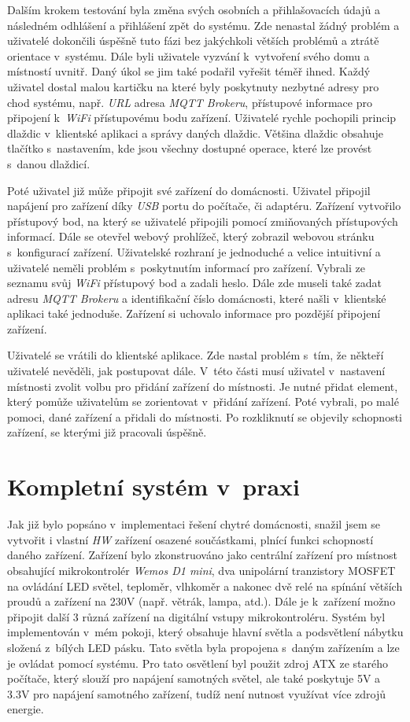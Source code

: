Dalším krokem testování byla změna svých osobních a přihlašovacích údajů a následném odhlášení a přihlášení zpět do systému.
Zde nenastal žádný problém a uživatelé dokončili úspěšně tuto fázi bez jakýchkoli větších problémů a ztrátě orientace v~systému.
\newpage
Dále byli uživatele vyzvání k~vytvoření svého domu a místností uvnitř.
Daný úkol se jim také podařil vyřešit téměř ihned.
Každý uživatel dostal malou kartičku na které byly poskytnuty nezbytné adresy pro chod systému, např. \emph{URL} adresa \emph{MQTT Brokeru}, přístupové informace pro připojení k~\emph{WiFi} přístupovému bodu zařízení.
Uživatelé rychle pochopili princip dlaždic v~klientské aplikaci a správy daných dlaždic.
Většina dlaždic obsahuje tlačítko s~nastavením, kde jsou všechny dostupné operace, které lze provést s~danou dlaždicí.

Poté uživatel již může připojit své zařízení do domácnosti.
Uživatel připojil napájení pro zařízení díky \emph{USB} portu do počítače, či adaptéru.
Zařízení vytvořilo přístupový bod, na který se uživatelé připojili pomocí zmiňovaných přístupových informací.
Dále se otevřel webový prohlížeč, který zobrazil webovou stránku s~konfigurací zařízení.
Uživatelské rozhraní je jednoduché a velice intuitivní a uživatelé neměli problém s~poskytnutím informací pro zařízení.
Vybrali ze seznamu svůj \emph{WiFi} přístupový bod a zadali heslo.
Dále zde museli také zadat adresu \emph{MQTT Brokeru} a identifikační číslo domácnosti, které našli v~klientské aplikaci také jednoduše.
Zařízení si uchovalo informace pro pozdější připojení zařízení.

Uživatelé se vrátili do klientské aplikace.
Zde nastal problém s~tím, že někteří uživatelé nevěděli, jak postupovat dále.
V~této části musí uživatel v~nastavení místnosti zvolit volbu pro přidání zařízení do místnosti.
Je nutné přidat element, který pomůže uživatelům se zorientovat v~přidání zařízení.
Poté vybrali, po malé pomoci, dané zařízení a přidali do místnosti.
Po rozkliknutí se objevily schopnosti zařízení, se kterými již pracovali úspěšně.

\section{Kompletní systém v~praxi}
\label{testovani:praxe}
Jak již bylo popsáno v~implementaci řešení chytré domácnosti, snažil jsem se vytvořit i vlastní \emph{HW} zařízení osazené součástkami, plnící funkci schopností daného zařízení.
Zařízení bylo zkonstruováno jako centrální zařízení pro místnost obsahující mikrokontrolér \emph{Wemos D1 mini}, dva unipolární tranzistory MOSFET na ovládání LED světel, teploměr, vlhkoměr a nakonec dvě relé na spínání větších proudů a zařízení na 230V (např. větrák, lampa, atd.).
Dále je k~zařízení možno připojit další 3 různá zařízení na digitální vstupy mikrokontroléru.
Systém byl implementován v~mém pokoji, který obsahuje hlavní světla a podsvětlení nábytku složená z~bílých LED pásku.
Tato světla byla propojena s~daným zařízením a lze je ovládat pomocí systému.
Pro tato osvětlení byl použit zdroj ATX ze starého počítače, který slouží pro napájení samotných světel, ale také poskytuje 5V a 3.3V pro napájení samotného zařízení, tudíž není nutnost využívat více zdrojů energie.

